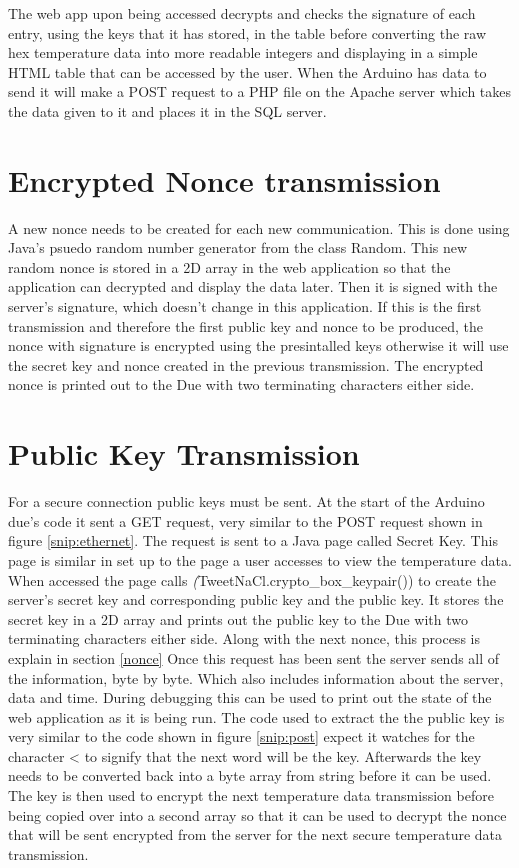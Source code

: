 The web app upon being accessed decrypts and checks the signature of each entry, using the keys that it has stored, in the table before converting the raw hex temperature data into more readable integers and displaying in a simple HTML table that can be accessed by the user. When the Arduino has data to send it will make a POST request to a PHP file on the Apache server which takes the data given to it and places it in the SQL server.

\section{Encrypted Nonce transmission}
A new nonce needs to be created for each new communication. This is done using Java's psuedo random number generator from the class Random. This new random nonce is stored in a 2D array in the web application so that the application can decrypted and display the data later. Then it is signed with the server's signature, which doesn't change in this application. If this is the first transmission and therefore the first public key and nonce to be produced, the nonce with signature is encrypted using the presintalled keys otherwise it will use the secret key and nonce created in the previous transmission. The encrypted nonce is printed out to the Due with two terminating characters either side.

\section{Public Key Transmission}
\label{pktransmit}

For a secure connection public keys must be sent. At the start of the Arduino due's code it sent a GET request, very similar to the POST request shown in figure \ref{snip:ethernet}. The request is sent to a Java page called Secret Key. This page is similar in set up to the page a user accesses to view the temperature data. When accessed the page calls \emph(TweetNaCl.crypto\_box\_keypair()) to create the server's secret key and corresponding public key and the public key. It stores the secret key in a 2D array and prints out the public key to the Due with two terminating characters either side. Along with the next nonce, this process is explain in section \ref{nonce} Once this request has been sent the server sends all of the information, byte by byte. Which also includes information about the server, data and time. During debugging this can be used to print out the state of the web application as it is being run. The code used to extract the the public key is very similar to the code shown in figure \ref{snip:post} expect it watches for the character < to signify that the next word will be the key. Afterwards the key needs to be converted back into a byte array from string before it can be used. The key is then used to encrypt the next temperature data transmission before being copied over into a second array so that it can be used to decrypt the nonce that will be sent encrypted from the server for the next secure temperature data transmission. 


